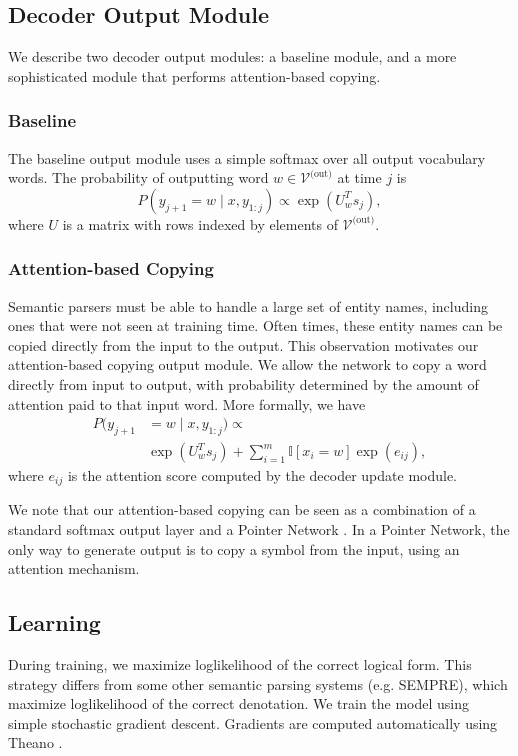 \documentclass[11pt,letterpaper]{article}
\newcommand{\vocabout}{\mathcal{V}^{\text{(out)}}}
\begin{document}
\subsection{Decoder Output Module}
We describe two decoder output modules: a baseline module, and a
more sophisticated module that performs attention-based copying.

\subsubsection{Baseline}
\label{sec:baseline-output}
The baseline output module uses a simple softmax over all
output vocabulary words.
The probability of outputting word $w \in \vocabout$ at time $j$ is \[
  P(y_{j+1} = w \mid x, y_{1:j}) \propto \exp(U_{w}^T s_j),
\]
where $U$ is a matrix with rows indexed by elements of $\vocabout$.

\subsubsection{Attention-based Copying}
Semantic parsers must be able to handle a large set of entity names,
including ones that were not seen at training time.
Often times, these entity names
can be copied directly from the input to the output.
This observation motivates our attention-based copying output module.
We allow the network to copy a word directly from input to output,
with probability determined by the amount of attention paid to that input word.
More formally, we have
\begin{align*}
  P(y_{j+1} &= w \mid x, y_{1:j}) \propto 
  \\ &\exp(U_{w}^T s_j)
  + \sum_{i=1}^m \mathbb{I}[x_i = w] \exp(e_{ij}),
\end{align*}
where $e_{ij}$ is the attention score computed by the decoder update module.

We note that our attention-based copying can be seen as a 
combination of a standard softmax output layer
and a Pointer Network \cite{vinyals2015pointer}.  In a Pointer Network,
the only way to generate output is to copy a symbol from the input,
using an attention mechanism.

\subsection{Learning}
During training, we maximize loglikelihood of the correct
logical form.
This strategy differs from some other semantic parsing systems
(e.g. SEMPRE), which maximize loglikelihood of the correct
denotation.
We train the model using simple stochastic gradient descent.
Gradients are computed automatically using Theano \cite{bergstra2010theano}.
\end{document}
